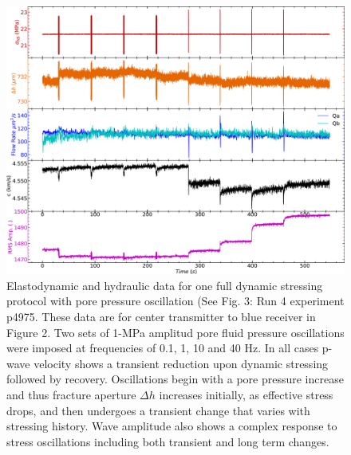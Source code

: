 \documentclass[letterpaper,10pt]{article}
\begin{document}
\newpage

\begin{figure}[ht]
	\centering
	\includegraphics[width=1\columnwidth]{NS_p4975_run4}
	\caption{Elastodynamic and hydraulic data for one full dynamic stressing protocol with pore pressure oscillation (See Fig. 3: Run 4 experiment p4975. These data are for center transmitter to blue receiver in Figure 2. Two sets of 1-MPa amplitud pore fluid pressure oscillations were imposed at frequencies of 0.1, 1, 10 and 40 Hz. In all cases p-wave velocity shows a transient reduction upon dynamic stressing followed by recovery. Oscillations begin with a pore pressure increase and thus fracture aperture $\Delta h$ increases initially, as effective stress drops, and then undergoes a transient change that varies with stressing history. Wave amplitude also shows a complex response to stress oscillations including both transient and long term changes. }
	\label{fig:run4_p4975}
\end{figure}

\newpage
\end{document}
